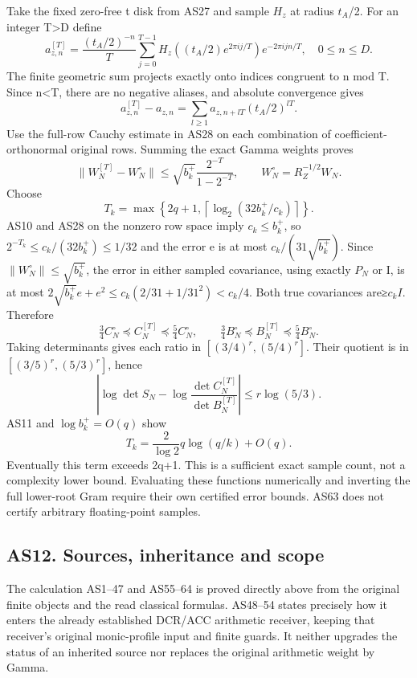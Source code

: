 \documentclass[11pt]{article}
\begin{document}
Take the fixed zero-free t disk from AS27 and sample \(H_z\) at radius \(t_A\)/2. For an integer T\textgreater D define \[
a_{z,n}^{[T]}=\frac{(t_A/2)^{-n}}T\sum_{j=0}^{T-1}
H_z((t_A/2)e^{2\pi ij/T})e^{-2\pi ijn/T},\quad0\le n\le D.
\tag{AS59}
\] The finite geometric sum projects exactly onto indices congruent to n mod T. Since n\textless T, there are no negative aliases, and absolute convergence gives \[
a_{z,n}^{[T]}-a_{z,n}=\sum_{l\ge1}a_{z,n+lT}(t_A/2)^{lT}.
\] Use the full-row Cauchy estimate in AS28 on each combination of coefficient-orthonormal original rows. Summing the exact Gamma weights proves \[
\|W_N^{[T]}-W_N^\circ\|
\le\sqrt{b_k^+}\frac{2^{-T}}{1-2^{-T}},
\qquad W_N^\circ=R_Z^{-1/2}W_N.
\tag{AS60}
\] Choose \[
T_k=\max\left\{2q+1,
\left\lceil\log_2(32b_k^+/c_k)\right\rceil\right\}.
\tag{AS61}
\] AS10 and AS28 on the nonzero row space imply \(c_k\le b_k^+\), so \(2^{-T_k}\le c_k/(32b_k^+)\le1/32\) and the error e is at most \(c_k/(31\sqrt{b_k^+})\). Since \(\|W_N^\circ\|\le\sqrt{b_k^+}\), the error in either sampled covariance, using exactly \(P_N\) or I, is at most \(2\sqrt{b_k^+}e+e^2\le c_k(2/31+1/31^2)<c_k/4\). Both true covariances are≥\(c_kI\). Therefore \[
\tfrac34C_N^\circ\preceq C_N^{[T]}\preceq\tfrac54C_N^\circ,
\qquad\tfrac34B_N^\circ\preceq B_N^{[T]}\preceq\tfrac54B_N^\circ.
\tag{AS62}
\] Taking determinants gives each ratio in \([(3/4)^r,(5/4)^r]\). Their quotient is in \([(3/5)^r,(5/3)^r]\), hence \[
\left|\log\det S_N-
\log\frac{\det C_N^{[T]}}{\det B_N^{[T]}}\right|
\le r\log(5/3).
\tag{AS63}
\] AS11 and \(\log b_k^+=O(q)\) show \[
T_k=\frac2{\log2}q\log(q/k)+O(q).
\tag{AS64}
\] Eventually this term exceeds 2q+1. This is a sufficient exact sample count, not a complexity lower bound. Evaluating these functions numerically and inverting the full lower-root Gram require their own certified error bounds. AS63 does not certify arbitrary floating-point samples.

\subsection{AS12. Sources, inheritance and scope}\label{as12.-sources-inheritance-and-scope}

The calculation AS1--47 and AS55--64 is proved directly above from the original finite objects and the read classical formulas. AS48--54 states precisely how it enters the already established DCR/ACC arithmetic receiver, keeping that receiver's original monic-profile input and finite guards. It neither upgrades the status of an inherited source nor replaces the original arithmetic weight by Gamma.
\end{document}
